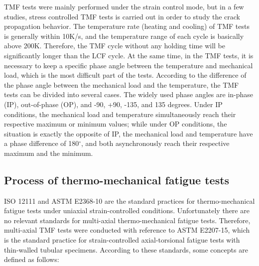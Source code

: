 TMF tests were mainly performed under the strain control mode, but in a few studies, stress controlled TMF tests is carried out in order to study the crack propagation behavior.
The temperature rate (heating and cooling) of TMF tests is generally within 10K/s, and the temperature range of each cycle is basically above 200K. Therefore, the TMF cycle without any holding time will be significantly longer than the LCF cycle. At the same time, in the TMF tests, it is necessary to keep a specific phase angle between the temperature and mechanical load, which is the most difficult part of the tests. According to the difference of the phase angle between the mechanical load and the temperature, the TMF tests can be divided into several cases. The widely used phase angles are in-phase (IP), out-of-phase (OP), and -90, +90, -135, and 135 degrees. Under IP conditions, the mechanical load and temperature simultaneously reach their respective maximum or minimum values; while under OP conditions, the situation is exactly the opposite of IP, the mechanical load and temperature have a phase difference of 180$^\circ$, and both asynchronously reach their respective maximum and the minimum.

\subsection{Process of thermo-mechanical fatigue tests}

ISO 12111 and ASTM E2368-10\cite{ASTME2005} are the standard practices for thermo-mechanical fatigue tests under uniaxial strain-controlled conditions.
Unfortunately there are no relevant standards for multi-axial thermo-mechanical fatigue tests.
Therefore, multi-axial TMF tests were conducted with reference to ASTM E2207-15, which is the standard practice for strain-controlled axial-torsional fatigue tests with thin-walled tubular specimens.
According to these standards, some concepts are defined as follows:

